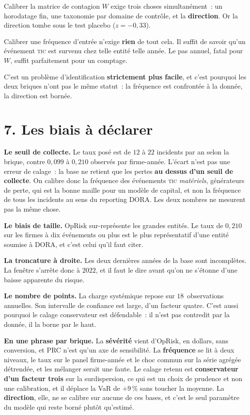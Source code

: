 \documentclass[11pt,a4paper]{article}
\begin{document}
Calibrer la matrice de contagion $W$ exige trois choses simultanément~: un horodatage fin,
une taxonomie par domaine de contrôle, et la \textbf{direction}. Or la direction tombe sous
le test placebo ($z=-0{,}33$).

Calibrer une fréquence d'entrée n'exige \textbf{rien} de tout cela. Il suffit de savoir
qu'un événement \textsc{tic} est survenu chez telle entité telle année. Le pas annuel, fatal
pour $W$, suffit parfaitement pour un comptage.

\medskip
\noindent C'est un problème d'identification \textbf{strictement plus facile}, et c'est
pourquoi les deux briques n'ont pas le même statut~: la fréquence est confrontée à la
donnée, la direction est bornée.

\section*{7. Les biais à déclarer}

\textbf{Le seuil de collecte.} Le taux posé est de $12$ à $22$ incidents par an selon la
brique, contre $0{,}099$ à $0{,}210$ observés par firme-année. L'écart n'est pas une erreur
de calage~: la base ne retient que les pertes \textbf{au dessus d'un seuil de collecte}. On
calibre donc la fréquence des événements \textsc{tic} \emph{matériels}, générateurs de
perte, qui est la bonne maille pour un modèle de capital, et non la fréquence de tous les
incidents au sens du reporting DORA. Les deux nombres ne mesurent pas la même chose.

\textbf{Le biais de taille.} OpRisk sur-représente les grandes entités. Le taux de $0{,}210$
sur les firmes à dix événements ou plus est le plus représentatif d'une entité soumise à
DORA, et c'est celui qu'il faut citer.

\textbf{La troncature à droite.} Les deux dernières années de la base sont incomplètes. La
fenêtre s'arrête donc à $2022$, et il faut le dire avant qu'on ne s'étonne d'une baisse
apparente du risque.

\textbf{Le nombre de points.} La charge systémique repose sur $18$~observations annuelles.
Son intervalle de confiance est large, d'un facteur quatre. C'est aussi pourquoi le calage
conservateur est défendable~: il n'est pas contredit par la donnée, il la borne par le haut.

\begin{cle}
\textbf{En une phrase par brique.} La \textbf{sévérité} vient d'OpRisk, en dollars, sans
conversion, et PRC n'est qu'un axe de sensibilité. La \textbf{fréquence} se lit à deux
niveaux, le taux sur le panel firme-année et le choc commun sur la série agrégée détrendée,
et les mélanger serait une faute. Le calage retenu est \textbf{conservateur d'un facteur
trois} sur la surdispersion, ce qui est un choix de prudence et non une calibration, et il
déplace la VaR de $+9\,\%$ sans toucher la moyenne. La \textbf{direction}, elle, ne se
calibre sur aucune de ces bases, et c'est le seul paramètre du modèle qui reste borné plutôt
qu'estimé.
\end{cle}
\end{document}
